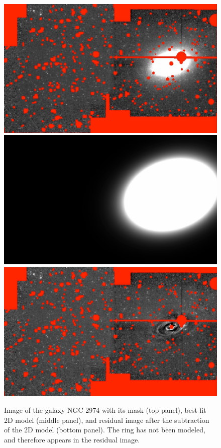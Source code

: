 \documentclass[preprint2]{emulateapj}
\begin{document}
\begin{figure}[h]
\begin{center}
\includegraphics[width=\columnwidth]{images/n2974_imgmsk.pdf}
\includegraphics[width=\columnwidth]{images/n2974_model.pdf}
\includegraphics[width=\columnwidth]{images/n2974_resid.pdf}
\caption{Image of the galaxy NGC 2974 with its mask (top panel), best-fit 2D model (middle panel), 
and residual image after the subtraction of the 2D model (bottom panel).
The ring has not been modeled, and therefore appears in the residual image.}
\label{fig:n29742d}
\end{center}
\end{figure}
\end{document}
